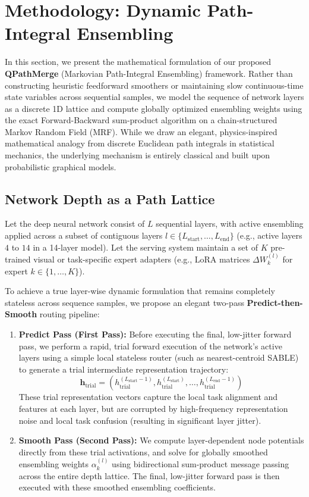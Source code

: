\section{Methodology: Dynamic Path-Integral Ensembling}
\label{sec:method}

In this section, we present the mathematical formulation of our proposed \textbf{QPathMerge} (Markovian Path-Integral Ensembling) framework. Rather than constructing heuristic feedforward smoothers or maintaining slow continuous-time state variables across sequential samples, we model the sequence of network layers as a discrete 1D lattice and compute globally optimized ensembling weights using the exact Forward-Backward sum-product algorithm on a chain-structured Markov Random Field (MRF). While we draw an elegant, physics-inspired mathematical analogy from discrete Euclidean path integrals in statistical mechanics, the underlying mechanism is entirely classical and built upon probabilistic graphical models.

\subsection{Network Depth as a Path Lattice}
Let the deep neural network consist of $L$ sequential layers, with active ensembling applied across a subset of contiguous layers $l \in \{L_{\text{start}}, \dots, L_{\text{end}}\}$ (e.g., active layers $4$ to $14$ in a 14-layer model). Let the serving system maintain a set of $K$ pre-trained visual or task-specific expert adapters (e.g., LoRA matrices $\Delta W_k^{(l)}$ for expert $k \in \{1, \dots, K\}$). 

To achieve a true layer-wise dynamic formulation that remains completely stateless across sequence samples, we propose an elegant two-pass \textbf{Predict-then-Smooth} routing pipeline:
\begin{enumerate}
    \item \textbf{Predict Pass (First Pass):} Before executing the final, low-jitter forward pass, we perform a rapid, trial forward execution of the network's active layers using a simple local stateless router (such as nearest-centroid SABLE) to generate a trial intermediate representation trajectory:
    \begin{equation}
        \mathbf{h}_{\text{trial}} = (h_{\text{trial}}^{(L_{\text{start}}-1)}, h_{\text{trial}}^{(L_{\text{start}})}, \dots, h_{\text{trial}}^{(L_{\text{end}}-1)})
    \end{equation}
    These trial representation vectors capture the local task alignment and features at each layer, but are corrupted by high-frequency representation noise and local task confusion (resulting in significant layer jitter).
    \item \textbf{Smooth Pass (Second Pass):} We compute layer-dependent node potentials directly from these trial activations, and solve for globally smoothed ensembling weights $\alpha_k^{(l)}$ using bidirectional sum-product message passing across the entire depth lattice. The final, low-jitter forward pass is then executed with these smoothed ensembling coefficients.
\end{enumerate}

